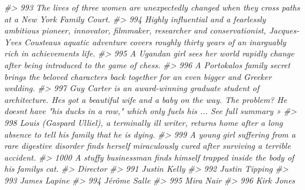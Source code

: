 \documentclass[
]{book}
\newenvironment{Shaded}{\begin{snugshade}}{\end{snugshade}}
\newcommand{\CommentTok}[1]{\textcolor[rgb]{0.56,0.35,0.01}{\textit{#1}}}
\begin{document}
\begin{Shaded}
\begin{Highlighting}[]
\CommentTok{\#\textgreater{} 993                                                                                                                                            The lives of three women are unexpectedly changed when they cross paths at a New York Family Court.}
\CommentTok{\#\textgreater{} 994                 Highly influential and a fearlessly ambitious pioneer, innovator, filmmaker, researcher and conservationist, Jacques{-}Yves Cousteau\textquotesingle{}s aquatic adventure covers roughly thirty years of an inarguably rich in achievements life.}
\CommentTok{\#\textgreater{} 995                                                                                                                                                      A Ugandan girl sees her world rapidly change after being introduced to the game of chess.}
\CommentTok{\#\textgreater{} 996                                                                                                                                 A Portokalos family secret brings the beloved characters back together for an even bigger and Greeker wedding.}
\CommentTok{\#\textgreater{} 997                               Guy Carter is an award{-}winning graduate student of architecture. He\textquotesingle{}s got a beautiful wife and a baby on the way. The problem? He doesn\textquotesingle{}t have "his ducks in a row," which only fuels his ... See full summary »}
\CommentTok{\#\textgreater{} 998                                                                                                                        Louis (Gaspard Ulliel), a terminally ill writer, returns home after a long absence to tell his family that he is dying.}
\CommentTok{\#\textgreater{} 999                                                                                                                    A young girl suffering from a rare digestive disorder finds herself miraculously cured after surviving a terrible accident.}
\CommentTok{\#\textgreater{} 1000                                                                                                                                                               A stuffy businessman finds himself trapped inside the body of his family\textquotesingle{}s cat.}
\CommentTok{\#\textgreater{}              Director}
\CommentTok{\#\textgreater{} 991      Justin Kelly}
\CommentTok{\#\textgreater{} 992    Justin Tipping}
\CommentTok{\#\textgreater{} 993      James Lapine}
\CommentTok{\#\textgreater{} 994      Jérôme Salle}
\CommentTok{\#\textgreater{} 995         Mira Nair}
\CommentTok{\#\textgreater{} 996        Kirk Jones}

\end{Highlighting}
\end{Shaded}
\end{document}
